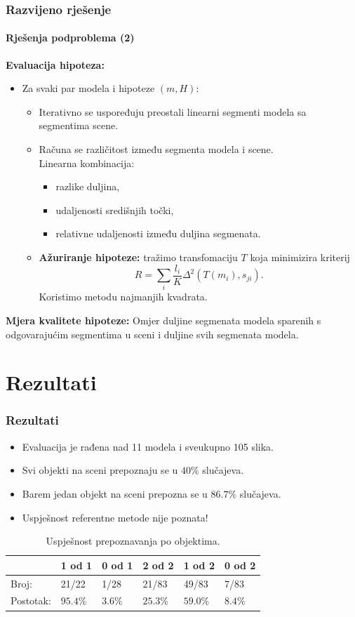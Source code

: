 \documentclass{beamer}
\begin{document}
\begin{frame}
\frametitle{Razvijeno rješenje}
\framesubtitle{Rješenja podproblema (2)}
\textbf{Evaluacija hipoteza:}
\begin{itemize}
  \item Za svaki par modela i hipoteze $(m, H)$:
  \begin{itemize}
    \item Iterativno se uspoređuju preostali linearni segmenti modela sa segmentima scene.
    \item Računa se različitost između segmenta modela i scene.\\
    Linearna kombinacija:
    \begin{itemize}
      \item razlike duljina,
      \item udaljenosti središnjih točki,
      \item relativne udaljenosti između duljina segmenata.
    \end{itemize}
    \item \textbf{Ažuriranje hipoteze:} tražimo transfomaciju $T$ koja minimizira kriterij
    $$R=\sum_i \frac{l_i}{K}\Delta^2(T(m_i),s_{ji}).$$
    Koristimo metodu najmanjih kvadrata.
  \end{itemize}
\end{itemize}
\pause
\textbf{Mjera kvalitete hipoteze:} Omjer duljine segmenata modela
sparenih s odgovarajućim segmentima u sceni i duljine svih segmenata modela.
\end{frame}

\section{Rezultati}
\begin{frame}
\frametitle{Rezultati}
\begin{itemize}
  \item Evaluacija je rađena nad 11 modela i sveukupno 105 slika.
  \item Svi objekti na sceni prepoznaju se u $40\%$ slučajeva.
  \item Barem jedan objekt na sceni prepozna se u $86.7\%$ slučajeva.
  \item Uspješnost referentne metode nije poznata!
\end{itemize}
\begin{table}[htb]
\centering
\caption{Uspješnost prepoznavanja po objektima.}
\label{tbl:po-obj}
\begin{tabular}{l l l l l l}
\toprule
 & 1 od 1 & 0 od 1 & 2 od 2 & 1 od 2 & 0 od 2\\
\midrule
Broj: & 21/22 & 1/28 & 21/83 & 49/83 & 7/83\\
Postotak: & $95.4\%$ & $3.6\%$ & $25.3\%$ & $59.0\%$ & $8.4\%$\\
\bottomrule
\end{tabular}
\end{table}
\end{frame}
\end{document}

